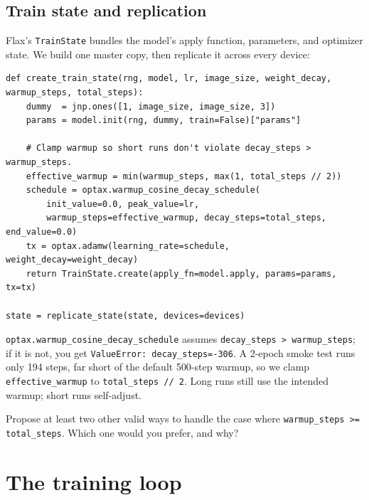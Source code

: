\documentclass[11pt,a4paper]{article}
\newcounter{exercise}[section]
\newcounter{lab}
\newcommand{\answerspace}[1][3]{\vspace{#1\baselineskip}}
\newcommand{\stars}[1]{\textbf{\small(#1)}}
\begin{document}
\subsection{Train state and replication}

Flax's \texttt{TrainState} bundles the model's apply function, parameters, and optimizer
state. We build one master copy, then replicate it across every device:

\begin{lstlisting}[style=py]
def create_train_state(rng, model, lr, image_size, weight_decay, warmup_steps, total_steps):
    dummy  = jnp.ones([1, image_size, image_size, 3])
    params = model.init(rng, dummy, train=False)["params"]

    # Clamp warmup so short runs don't violate decay_steps > warmup_steps.
    effective_warmup = min(warmup_steps, max(1, total_steps // 2))
    schedule = optax.warmup_cosine_decay_schedule(
        init_value=0.0, peak_value=lr,
        warmup_steps=effective_warmup, decay_steps=total_steps, end_value=0.0)
    tx = optax.adamw(learning_rate=schedule, weight_decay=weight_decay)
    return TrainState.create(apply_fn=model.apply, params=params, tx=tx)

state = replicate_state(state, devices=devices)
\end{lstlisting}

\begin{pitfall}
\texttt{optax.warmup\_cosine\_decay\_schedule} assumes \texttt{decay\_steps > warmup\_steps};
if it is not, you get \texttt{ValueError: decay\_steps=-306}. A 2-epoch smoke test runs
only 194 steps, far short of the default 500-step warmup, so we clamp
\texttt{effective\_warmup} to \texttt{total\_steps // 2}. Long runs still use the intended
warmup; short runs self-adjust.
\end{pitfall}

\begin{exercise}[Fixing the clamp differently, \stars{2}]
Propose at least two other valid ways to handle the case where
\texttt{warmup\_steps >= total\_steps}. Which one would you prefer, and why?
\answerspace[3]
\end{exercise}

\section{The training loop}
\label{sec:training-loop}
\end{document}
